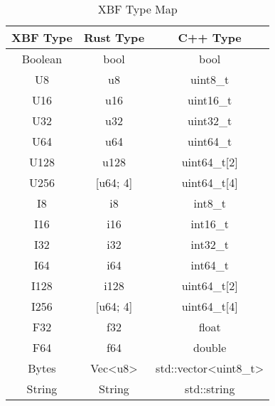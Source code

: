 \documentclass[conference]{IEEEtran}
\begin{document}
\begin{table}[htbp]
	\caption{XBF Type Map}\label{type_map}
	\begin{center}
		\begin{tabular}{|c|c|c|}
			\hline
			\textbf{XBF Type} & \textbf{Rust Type}          & \textbf{C++ Type}                         \\
			\hline
			Boolean           & bool                        & bool                                      \\
			U8                & u8                          & uint8\_t                                  \\
			U16               & u16                         & uint16\_t                                 \\
			U32               & u32                         & uint32\_t                                 \\
			U64               & u64                         & uint64\_t                                 \\
			U128              & u128                        & uint64\_t[2]                              \\
			U256              & [u64; 4]                    & uint64\_t[4]                              \\
			I8                & i8                          & int8\_t                                   \\
			I16               & i16                         & int16\_t                                  \\
			I32               & i32                         & int32\_t                                  \\
			I64               & i64                         & int64\_t                                  \\
			I128              & i128                        & uint64\_t[2]                              \\
			I256              & [u64; 4]                    & uint64\_t[4]                              \\
			F32               & f32                         & float                                     \\
			F64               & f64                         & double                                    \\
			Bytes             & Vec\textless u8\textgreater & std::vector\textless uint8\_t\textgreater \\
			String            & String                      & std::string                               \\
			\hline
		\end{tabular}
	\end{center}
\end{table}
\end{document}
